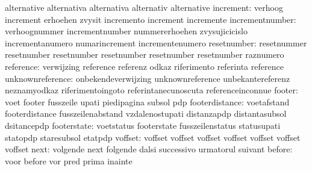                            alternative               alternativa
                           alternativa               alternativ
                           alternative
                increment: verhoog                   increment
                           erhoehen                  zvysit
                           incremento                increment
                           incremente
          incrementnumber: verhoognummer             incrementnumber
                           nummererhoehen            zvysujicicislo
                           incrementanumero          numarincrement
                           incrementenumero
              resetnumber: resetnummer               resetnumber
                           resetnumber               resetnumber
                           resetnumber               resetnumber
                           raznumero
                reference: verwijzing                reference
                           referenz                  odkaz
                           riferimento               referinta
                           reference
         unknownreference: onbekendeverwijzing       unknownreference
                           unbekantereferenz         neznamyodkaz
                           riferimentoingoto         referintanecunoscuta
                           referenceinconnue
                   footer: voet                      footer
                           fusszeile                 upati
                           piedipagina               subsol
                           pdp
           footerdistance: voetafstand               footerdistance
                           fusszeilenabstand         vzdalenostupati
                           distanzapdp               distantasubsol
                           dsitancepdp
              footerstate: voetstatus                footerstate
                           fusszeilenstatus          statusupati
                           statopdp                  staresubsol
                           etatpdp
                  voffset: voffset                   voffset
                           voffset                   voffset
                           voffset                   voffset
                           voffset
                     next: volgende                  next
                           folgende                  dalsi
                           successivo                urmatorul
                           suivant
                   before: voor                      before
                           vor                       pred
                           prima                     inainte
